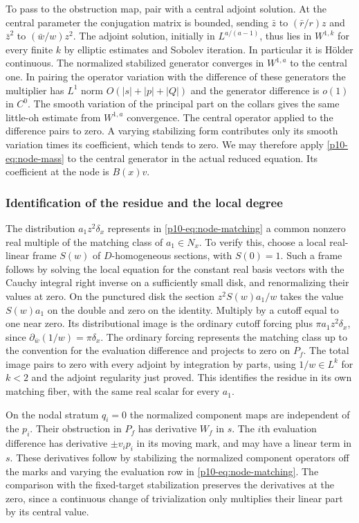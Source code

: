 To pass to the obstruction map, pair with a central adjoint solution.
At the central parameter the conjugation matrix is bounded, sending
$\bar z$ to $(\bar r/r)z$ and $\bar z^2$ to $(\bar w/w)z^2$.
The adjoint solution, initially in $L^{a/(a-1)}$, thus lies in
$W^{1,k}$ for every finite $k$ by elliptic estimates and Sobolev
iteration. In particular it is H\"older continuous. The normalized
stabilized generator converges in $W^{1,a}$ to the central one.
In pairing the operator variation with the difference of these
generators the multiplier has $L^1$ norm $O(|s|+|p|+|Q|)$ and the
generator difference is $o(1)$ in $C^0$. The smooth variation of the
principal part on the collars gives the same little-oh estimate from
$W^{1,a}$ convergence. The central operator applied to the difference
pairs to zero. A varying stabilizing form contributes only its smooth
variation times its coefficient, which tends to zero. We may therefore
apply \eqref{p10-eq:node-mass} to the central generator in the actual
reduced equation. Its coefficient at the node is $B(x)v$.

\subsubsection{Identification of the residue and the local degree}

The distribution $a_1 z^2\delta_x$ represents in
\eqref{p10-eq:node-matching} a common nonzero real multiple of the matching
class of $a_1\in N_x$. To verify this, choose a local real-linear frame
$S(w)$ of $D$-homogeneous sections, with $S(0)=1$. Such a frame follows
by solving the local equation for the constant real basis vectors with
the Cauchy integral right inverse on a sufficiently small disk, and
renormalizing their values at zero. On the punctured disk the section
$z^2 S(w)a_1/w$ takes the value $S(w)a_1$ on the double and zero on the
identity. Multiply by a cutoff equal to one near zero. Its
distributional image is the ordinary cutoff forcing plus
$\pi a_1 z^2\delta_x$, since $\partial_{\bar w}(1/w)=\pi\delta_x$.
The ordinary forcing represents the matching class up to the convention
for the evaluation difference and projects to zero on $P_f$. The total
image pairs to zero with every adjoint by integration by parts, using
$1/w\in L^k$ for $k<2$ and the adjoint regularity just proved. This
identifies the residue in its own matching fiber, with the same real
scalar for every $a_1$.

On the nodal stratum $q_i=0$ the normalized component maps are
independent of the $p_i$. Their obstruction in $P_f$ has derivative
$W_f$ in $s$. The $i$th evaluation difference has derivative
$\pm v_i p_i$ in its moving mark, and may have a linear term in $s$.
These derivatives follow by stabilizing the normalized component
operators off the marks and varying the evaluation row in
\eqref{p10-eq:node-matching}. The comparison with the fixed-target
stabilization preserves the derivatives at the zero, since a continuous
change of trivialization only multiplies their linear part by its
central value.



